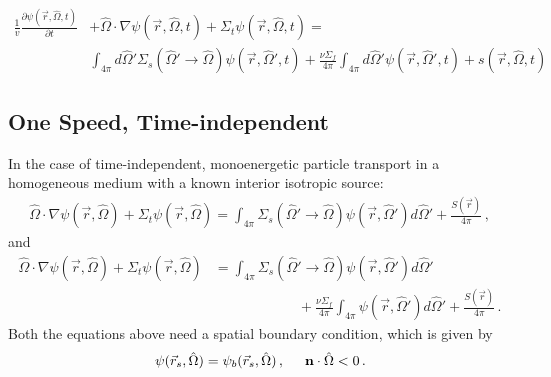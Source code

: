 \documentclass[12pt]{article}
\newcommand{\rvec}{\ensuremath{\vec{r}}}
\newcommand{\omvec}{\ensuremath{\hat{\Omega}}}
\newcommand{\vOmega}{\ensuremath{\hat{\Omega}}}
\begin{document}
\begin{align*}
\frac{1}{v}\frac{\partial \psi(\vec{r}, \vOmega, t)}{\partial t} &+ 
\vOmega \cdot \nabla \psi(\vec{r}, \vOmega, t) +
\Sigma_t \psi(\vec{r}, \vOmega, t) = \nonumber\\
%
& \int_{4\pi} d\vOmega' \Sigma_s(\vOmega' \rightarrow \vOmega) \psi(\vec{r}, \vOmega', t)  
+ \frac{\nu \Sigma_f}{4\pi} \int_{4\pi} d\vOmega' \psi(\vec{r},  \vOmega', t) 
+ s(\vec{r}, \vOmega, t) 
\end{align*}



\subsection*{One Speed, Time-independent}
In the case of time-independent, monoenergetic particle transport in a homogeneous medium with a known interior isotropic source:
\begin{align*}
\omvec\cdot  \nabla \psi(\rvec,\omvec) +
 \Sigma_t\psi(\rvec,\omvec)
=
\int_{4\pi}\Sigma_s(\omvec'\rightarrow\omvec)
\psi(\rvec,\omvec')d\omvec'+\frac{S(\rvec)}{4\pi}\,,
\end{align*}
and 
\begin{align*}
\omvec\cdot  \nabla \psi(\rvec,\omvec) +
 \Sigma_t\psi(\rvec,\omvec)%
 &=
\int_{4\pi}\Sigma_s(\omvec'\rightarrow\omvec)
\psi(\rvec,\omvec')d\omvec'\\&\quad\quad\quad\quad\quad\quad
 +\frac{\nu\Sigma_f}{4\pi}\int_{4\pi}
\psi(\rvec,\omvec')d\omvec'+\frac{S(\rvec)}{4\pi}\,.\nonumber
\end{align*}
Both the equations above need a spatial boundary condition, which is given by
\begin{align*}
\psi(\rvec_s,\omvec) = \psi_b(\rvec_s,\omvec)\,, \hspace{0.5 cm} \textbf{n} \cdot \omvec <0\,.
\end{align*}
\end{document}
